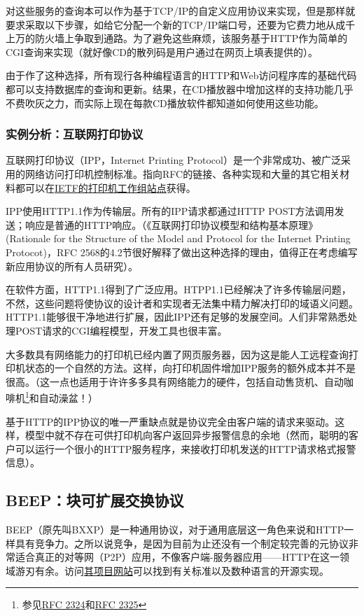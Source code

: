 \documentclass[12pt,oneside]{ctexbook}
\begin{document}
\begin{common-format}
对这些服务的查询本可以作为基于TCP/IP的自定义应用协议来实现，但是那样就要求采取以下步骤，如给它分配一个新的TCP/IP端口号，还要为它费力地从成千上万的防火墙上争取到通路。为了避免这些麻烦，该服务基于HTTP作为简单的CGI查询来实现（就好像CD的散列码是用户通过在网页上填表提供的）。

由于作了这种选择，所有现行各种编程语言的HTTP和Web访问程序库的基础代码都可以支持数据库的查询和更新。结果，在CD播放器中增加这样的支持功能几乎不费吹灰之力，而实际上现在每款CD播放软件都知道如何使用这些功能。

\subsubsection{实例分析：互联网打印协议}
互联网打印协议（IPP，Internet Printing Protocol）是一个非常成功、被广泛采用的网络访问打印机控制标准。指向RFC的链接、各种实现和大量的其它相关材料都可以在\href{http://www.pwg.org/ipp/}{IETF的打印机工作组站点}获得。

IPP使用HTTP1.1作为传输层。所有的IPP请求都通过HTTP POST方法调用发送；响应是普通的HTTP响应。（《互联网打印协议模型和结构基本原理》(Rationale for the Structure of the Model and Protocol for the Internet Printing Protocot)，RFC 2568的4.2节很好解释了做出这种选择的理由，值得正在考虑编写新应用协议的所有人员研究）。

在软件方面，HTTP1.1得到了广泛应用。HTPP1.1已经解决了许多传输层问题，不然，这些问题将使协议的设计者和实现者无法集中精力解决打印的域语义问题。HTTP1.1能够很干净地进行扩展，因此IPP还有足够的发展空间。人们非常熟悉处理POST请求的CGI编程模型，开发工具也很丰富。

大多数具有网络能力的打印机已经内置了网页服务器，因为这是能人工远程查询打印机状态的一个自然的方法。这样，向打印机固件增加IPP服务的额外成本并不是很高。（这一点也适用于许许多多具有网络能力的硬件，包括自动售货机、自动咖啡机\footnote{参见\href{http://www.ietf.org/rfc/rfc2324.txt}{RFC 2324}和\href{http://www.ietf.org/rfc/rfc2325.txt}{RFC 2325}}和自动澡盆！）

基于HTTP的IPP协议的唯一严重缺点就是协议完全由客户端的请求来驱动。这样，模型中就不存在可供打印机向客户返回异步报警信息的余地（然而，聪明的客户可以运行一个很小的HTTP服务程序，来接收打印机发送的HTTP请求格式报警信息）。

\subsection{BEEP：块可扩展交换协议}
BEEP（原先叫BXXP）是一种通用协议，对于通用底层这一角色来说和HTTP一样具有竞争力。之所以说竞争，是因为目前为止还没有一个制定较完善的元协议非常适合真正的对等网（P2P）应用，不像客户端-服务器应用——HTTP在这一领域游刃有余。访问\href{http://www.beepcore.org/beepcore/docs/sl-beep.jsp}{其项目网站}可以找到有关标准以及数种语言的开源实现。


\end{common-format}
\end{document}
